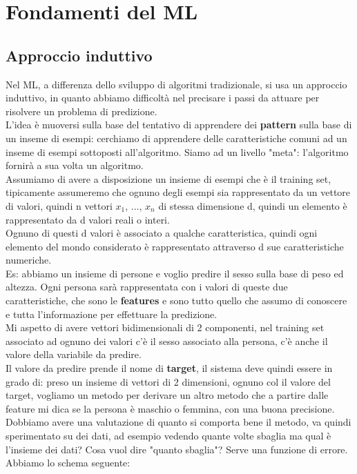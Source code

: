 \documentclass[12pt, oneside]{extbook}
\begin{document}
\chapter{Fondamenti del ML}
\section{Approccio induttivo}
Nel ML, a differenza dello sviluppo di algoritmi tradizionale, si usa un approccio induttivo, in quanto abbiamo difficoltà nel precisare i passi da attuare per risolvere un problema di predizione.\\L'idea è muoversi sulla base del tentativo di apprendere dei \textbf{pattern} sulla base di un inseme di esempi: cerchiamo di apprendere delle caratteristiche comuni ad un inseme di esempi sottoposti all'algoritmo. Siamo ad un livello "meta": l'algoritmo fornirà a sua volta un algoritmo.\\Assumiamo di avere a disposizione un insieme di esempi che è il training set, tipicamente assumeremo che ognuno degli esempi sia rappresentato da un vettore di valori, quindi n vettori $x_1$, ..., $x_n$ di stessa dimensione d, quindi un elemento è rappresentato da d valori reali o interi.\\Ognuno di questi d valori è associato a qualche caratteristica, quindi ogni elemento del mondo considerato è rappresentato attraverso d sue caratteristiche numeriche.\\Es: abbiamo un insieme di persone e voglio predire il sesso sulla base di peso ed altezza. Ogni persona sarà rappresentata con i valori di queste due caratteristiche, che sono le \textbf{features} e sono tutto quello che assumo di conoscere e tutta l'informazione per effettuare la predizione.\\Mi aspetto di avere vettori bidimensionali di 2 componenti, nel training set associato ad ognuno dei valori c'è il sesso associato alla persona, c'è anche il valore della variabile da predire.\\Il valore da predire prende il nome di \textbf{target}, il sistema deve quindi essere in grado di: preso un insieme di vettori di 2 dimensioni, ognuno col il valore del target, vogliamo un metodo per derivare un altro metodo che a partire dalle feature mi dica se la persona è maschio o femmina, con una buona precisione.\\Dobbiamo avere una valutazione di quanto si comporta bene il metodo, va quindi sperimentato su dei dati, ad esempio vedendo quante volte sbaglia ma qual è l'insieme dei dati? Cosa vuol dire "quanto sbaglia"? Serve una funzione di errore.\\Abbiamo lo schema seguente:\\
\end{document}
